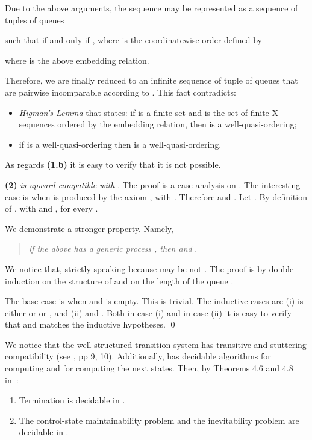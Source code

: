 \documentclass{LMCS}
\theoremstyle{plain}\newtheorem{proposition}[thm]{Proposition}
\theoremstyle{plain}\newtheorem{lemma}[thm]{Lemma}
\theoremstyle{plain}\newtheorem{theorem}[thm]{Theorem}
\theoremstyle{plain}\newtheorem{corollary}[thm]{Corollary}
\begin{document}
Due to the above arguments, the sequence  may be represented as a sequence of tuples of 
queues 

such that  if and only if 
, where  is the 
coordinatewise order defined by

where  is the above embedding relation.

Therefore, we are finally reduced to an infinite sequence of tuple of queues 
that are pairwise incomparable according to . This fact contradicts:
\begin{itemize}
\item 
\emph{Higman's Lemma} \cite{HigmanLemma} that states: if  is a finite set and  is the set of finite X-sequences ordered by the embedding 
relation, then  is a  well-quasi-ordering;

\item 
if  is a well-quasi-ordering then  is a well-quasi-ordering.
\end{itemize}

As regards {\bf (1.b)} it is easy to verify that it is not possible.

\medskip

{\bf (2)} \emph{ is upward compatible with }. The proof is a case analysis on .
The interesting case is when  is produced by the axiom 
,
with . Therefore  and 
.
Let . 
By definition of ,
 with  and , for every .

We demonstrate a stronger property. Namely, 
\begin{quote}
\emph{if the above  has a generic process , then  and }. 
\end{quote}
We notice that,
strictly speaking  because  may be 
not . The
proof is by double induction on the 
structure of  and on the length of the queue .

The base case is when  and  is empty. This is trivial. 
The inductive cases are (i)  is either
 or  or
, and (ii)  and .
Both in case (i) and in case (ii) it is easy to verify that  and  matches the inductive hypotheses.
\qed
\fi

\bigskip

We notice that the well-structured transition system  has transitive and stuttering compatibility (see \cite{Finkel:2001}, pp 9, 10). Additionally,  has decidable algorithms for 
computing  and for computing the next states. Then, by Theorems 4.6
and 4.8 in~\cite{Finkel:2001}:

\begin{thm}
\begin{enumerate}
\item
Termination is decidable in .
\item
The control-state maintainability problem and the inevitability problem are decidable in .
\end{enumerate}
\end{thm}
\fi
\end{document}
